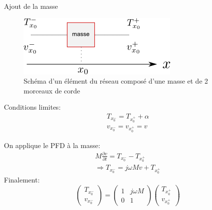 \documentclass[xcolor=x11names,compress]{beamer}
\renewcommand{\(}{\begin{columns}}
\renewcommand{\)}{\end{columns}}
\newcommand{\<}[1]{\begin{column}{#1}}
\renewcommand{\>}{\end{column}}
\begin{document}
\begin{frame}{Ajout de la masse}
\begin{minipage}[t]{0.49\linewidth}
\begin{figure}[h!]
\centering \includegraphics[scale = 0.5]{./figures/masse_graphic.png}
\caption*{\scriptsize Schéma d'un élément du réseau composé d'une masse et de 2 morceaux de corde }
\end{figure}
\end{minipage}
\begin{minipage}[t]{0.49\linewidth}
Conditions limites:
\begin{eqnarray*}
T_{x_0^{-}} = T_{x_0^{+}} + \alpha \\
v_{x_0^{-}} = v_{x_0^{+}} = v
\end{eqnarray*}
\end{minipage}

On applique le PFD à la masse:
\begin{eqnarray*}
M \frac{\partial v}{\partial t} = T_{x_0^{-}} - T_{x_0^{+}} \\
\Rightarrow T_{x_0^{-}} = j \omega M v + T_{x_0^{+}}
\end{eqnarray*} 
Finalement: 
\begin{equation}
\begin{pmatrix} T_{x_0^{-}} \\ v_{x_0^{-}} \end{pmatrix} = \begin{pmatrix} 1 & j \omega M \\ 0 & 1 \end{pmatrix}\begin{pmatrix} T_{x_0^{+}} \\ v_{x_0^{+}} \end{pmatrix}
\end{equation}
\end{frame}
\end{document}
